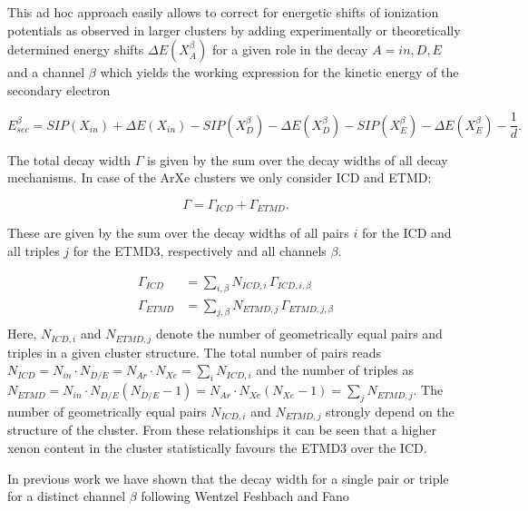 This ad hoc approach easily allows to correct for energetic shifts of         
ionization potentials as observed in larger clusters by adding experimentally
or theoretically determined energy shifts $\Delta E(X_{A}^{\beta})$
for a given role in the decay
$A=in,D,E$ and a channel $\beta$ which yields
the working expression for the kinetic energy of the secondary electron

\begin{equation}
 E_{sec}^\beta = SIP(X_{in}) + \Delta E (X_{in})
               - SIP(X_{D}^\beta) - \Delta E (X_{D}^\beta)
               - SIP(X_{E}^\beta) - \Delta E (X_{E}^\beta)
               - \frac 1d .
\end{equation}

The total decay width $\Gamma$ is given by the sum over the decay widths
of all decay mechanisms. In case of the ArXe clusters we only consider
ICD and ETMD:

\begin{equation}
 \Gamma = \Gamma_{ICD} + \Gamma_{ETMD} .
\end{equation}

These are given by the sum over the decay widths of all pairs $i$ for the
ICD and all triples $j$ for the ETMD3, respectively and all channels $\beta$.

\begin{align}
 \Gamma_{ICD}  &= \sum\limits_{i,\beta} N_{ICD,i}  \, \Gamma_{ICD,i,\beta}\\
 \Gamma_{ETMD} &= \sum\limits_{j,\beta} N_{ETMD,j} \, \Gamma_{ETMD,j,\beta}\\
\end{align}
Here, $N_{ICD,i}$ and $N_{ETMD,j}$ denote the number of geometrically
equal pairs and triples in a given cluster structure. The total number of pairs
reads
$N_{ICD} = N_{in} \cdot N_{D/E} = N_{Ar} \cdot N_{Xe}
 = \sum\limits_i N_{ICD,i}$ and the number of triples as
$N_{ETMD} = N_{in} \cdot N_{D/E} (N_{D/E} - 1) = N_{Ar} \cdot N_{Xe} (N_{Xe} - 1)
 = \sum\limits_j N_{ETMD,j}$.
The number of geometrically equal pairs $N_{ICD,i}$ and $N_{ETMD,j}$
strongly depend on the structure of the cluster. From these relationships
it can be seen that a higher xenon content in the cluster statistically
favours the ETMD3 over the ICD.

In previous work \cite{Fasshauer13,Fasshauer_PhD} we have shown that
the decay width for a single pair or triple for a distinct channel $\beta$
following Wentzel \cite{Wentzel27} Feshbach\cite{Feshbach58,Feshbach62}
and Fano \cite{Fano61}

